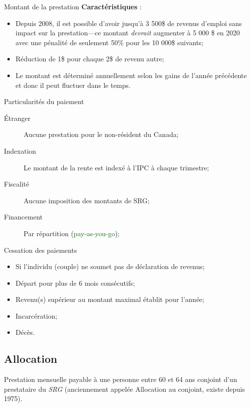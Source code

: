 \documentclass[10pt, french]{article}
\begin{document}
\begin{multicols*}{3}
\begin{conceptgen}{Montant de la prestation}
\textbf{Caractéristiques} : 
\begin{itemize}[leftmargin = *]
	\item	Depuis 2008, il est possible d'avoir jusqu'à 3 500\$ de revenus d'emploi sans impact sur la prestation---ce montant \textit{devrait} augmenter à 5 000 \$ en 2020 avec une pénalité de seulement 50\% pour les 10 000\$ suivants;
	\item	Réduction de 1\$ pour chaque 2\$ de revenu autre;
	\item	Le montant est déterminé annuellement selon les gains de l'année précédente et donc il peut fluctuer dans le temps.
\end{itemize}
\end{conceptgen}

\begin{conceptgen}{Particularités du paiement}
\begin{description}
	\item[Étranger]	Aucune prestation pour le non-résident du Canada;
	\item[Indexation]	Le montant de la rente est indexé à l'IPC à chaque trimestre;
	\item[Fiscalité]	Aucune imposition des montants de SRG;
	\item[Financement]	Par répartition (\textcolor{darkgreen}{pay-as-you-go});
\end{description}
\end{conceptgen}

\begin{conceptgen}{Cessation des paiements}
\begin{itemize}[leftmargin = *]
	\item	Si l'individu (couple) ne soumet pas de déclaration de revenus;
	\item	Départ pour plus de 6 mois consécutifs;
	\item	Revenu(s) supérieur au montant maximal établit pour l'année;
	\item	Incarcération;
	\item	Décès.
\end{itemize}
\end{conceptgen}

\columnbreak

\subsection{Allocation}
\label{sec:Alloc}
\begin{definitionNOHFILL}[Définition]
Prestation mensuelle payable à une personne entre 60 et 64 ans conjoint d'un prestataire du \textit{SRG} (anciennement appelée Allocation au conjoint, existe depuis 1975).
\end{definitionNOHFILL}


\end{multicols*}
\end{document}
